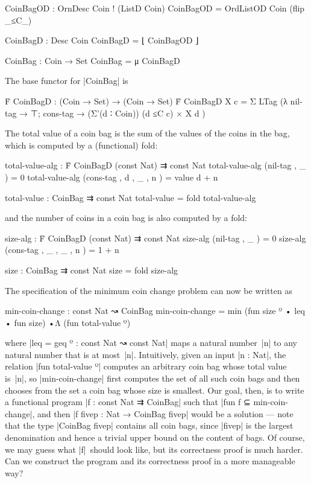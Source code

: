 \begin{code}
CoinBagOD : OrnDesc Coin ! (ListD Coin)
CoinBagOD = OrdListOD Coin (flip _≤C_)

CoinBagD : Desc Coin
CoinBagD = ⌊ CoinBagOD ⌋

CoinBag : Coin → Set
CoinBag = μ CoinBagD
\end{code}
The base functor for |CoinBag| is
\begin{code}
Ḟ CoinBagD : (Coin → Set) → (Coin → Set)
Ḟ CoinBagD X c =
  Σ LTag (λ { nil-tag → ⊤; cons-tag → (Σ'(d ∶ Coin)) (d ≤C c) × X d })
\end{code}
The total value of a coin bag is the sum of the values of the coins in the bag, which is computed by a (functional) fold:
\begin{code}
total-value-alg : Ḟ CoinBagD (const Nat) ⇉ const Nat
total-value-alg (nil-tag   , _          )  =  0
total-value-alg (cons-tag  , d , _ , n  )  =  value d + n

total-value : CoinBag ⇉ const Nat
total-value = fold total-value-alg
\end{code}
and the number of coins in a coin bag is also computed by a fold:
\begin{code}
size-alg : Ḟ CoinBagD (const Nat) ⇉ const Nat
size-alg (nil-tag   , _          )  =  0
size-alg (cons-tag  , _ , _ , n  )  =  1 + n

size : CoinBag ⇉ const Nat
size = fold size-alg
\end{code}
The specification of the minimum coin change problem can now be written as
\begin{code}
min-coin-change : const Nat ↝ CoinBag
min-coin-change =
  min (fun size º • leq • fun size) •Λ (fun total-value º)
\end{code}
where |leq = geq º : const Nat ↝ const Nat| maps a natural number~|n| to any natural number that is at most~|n|.
Intuitively, given an input |n : Nat|, the relation |fun total-value º| computes an arbitrary coin bag whose total value is~|n|, so |min-coin-change| first computes the set of all such coin bags and then chooses from the set a coin bag whose size is smallest.
Our goal, then, is to write a functional program |f : const Nat ⇉ CoinBag| such that |fun f ⊆ min-coin-change|, and then |f fivep : Nat → CoinBag fivep| would be a solution --- note that the type |CoinBag fivep| contains all coin bags, since |fivep| is the largest denomination and hence a trivial upper bound on the content of bags.
Of course, we may guess what |f|~should look like, but its correctness proof is much harder.
Can we construct the program and its correctness proof in a more manageable way?

